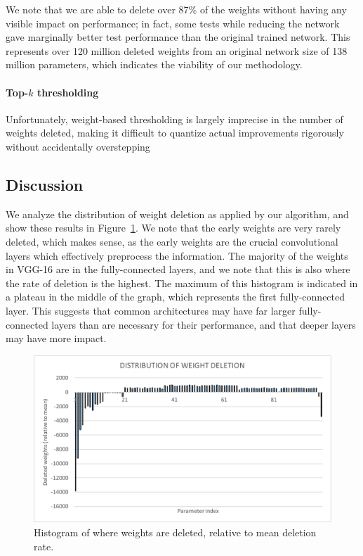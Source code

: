 \documentclass[10pt,twocolumn,letterpaper]{article}
\begin{document}
We note that we are able to delete over 87\% of the weights without having any visible impact on performance; in fact, some tests while reducing the network gave marginally better test performance than the original trained network.
This represents over 120 million deleted weights from an original network size of 138 million parameters, which indicates the viability of our methodology.

\paragraph{Top-$k$ thresholding}
Unfortunately, weight-based thresholding is largely imprecise in the number of weights deleted, making it difficult to quantize actual improvements rigorously without accidentally overstepping

\subsection{Discussion}
We analyze the distribution of weight deletion as applied by our algorithm, and show these results in Figure~\ref{fig:vgg-histo}.
We note that the early weights are very rarely deleted, which makes sense, as the early weights are the crucial convolutional layers which effectively preprocess the information.
The majority of the weights in VGG-16 are in the fully-connected layers, and we note that this is also where the rate of deletion is the highest.
The maximum of this histogram is indicated in a plateau in the middle of the graph, which represents the first fully-connected layer.
This suggests that common architectures may have far larger fully-connected layers than are necessary for their performance, and that deeper layers may have more impact.

\begin{figure}[h]
  \centering
  \includegraphics[width=\linewidth]{cifar-histogram.pdf}
  \caption{Histogram of where weights are deleted, relative to mean deletion rate.}
  \label{fig:vgg-histo}
\end{figure}
\end{document}

